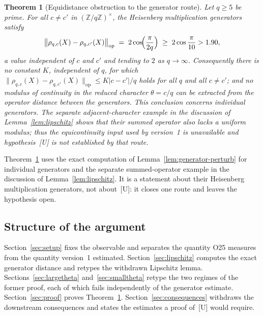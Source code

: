 \documentclass[12pt,a4paper]{article}
\newtheorem{theorem}{Theorem}[section]
\theoremstyle{definition}
\theoremstyle{remark}
\begin{document}
      \begin{theorem}[Equidistance obstruction to the generator route]\label{thm:main}
        Let $q \geq 5$ be prime.
        For all $c \neq c'$ in $(\mathbb{Z}/q\mathbb{Z})^\times$, the Heisenberg multiplication
        generators satisfy
        \begin{equation}\label{eq:rate}
          \bigl\|\rho_{q,c}(X) - \rho_{q,c'}(X)\bigr\|_{\mathrm{op}}
          \;=\; 2\cos\!\Bigl(\frac{\pi}{2q}\Bigr) \;\geq\; 2\cos\frac{\pi}{10} > 1.90,
        \end{equation}
        a value independent of $c$ and $c'$ and tending to $2$ as $q \to \infty$.
        Consequently there is no constant $K$, independent of $q$, for which
        $\|\rho_{q,c}(X) - \rho_{q,c'}(X)\|_{\mathrm{op}} \leq K|c-c'|/q$ holds for all
        $q$ and all $c \neq c'$; and no modulus of continuity in the reduced character
        $\theta = c/q$ can be extracted from the operator distance between the generators.
        This conclusion concerns individual generators.
        The separate adjacent-character example in the discussion of
        Lemma~\ref{lem:lipschitz} shows that their summed operator also lacks a uniform
        modulus; thus the equicontinuity input used by version~1 is unavailable and
        hypothesis~[U] is not established by that route.
      \end{theorem}

      Theorem~\ref{thm:main} uses the exact computation of
      Lemma~\ref{lem:generator-perturb} for individual generators and the separate
      summed-operator example in the discussion of Lemma~\ref{lem:lipschitz}.
      It is a statement about their Heisenberg multiplication generators, not about~[U]:
      it closes one route and
      leaves the hypothesis open.

    \subsection{Structure of the argument}

      Section~\ref{sec:setup} fixes the observable and separates the quantity O25 measures
      from the quantity version~1 estimated.
      Section~\ref{sec:lipschitz} computes the exact generator distance and retypes the
      withdrawn Lipschitz lemma.
      Sections~\ref{sec:largetheta} and~\ref{sec:smalltheta} retype the two regimes of the
      former proof, each of which fails independently of the generator estimate.
      Section~\ref{sec:proof} proves Theorem~\ref{thm:main}.
      Section~\ref{sec:consequences} withdraws the downstream consequences and states the
      estimates a proof of~[U] would require.
\end{document}
